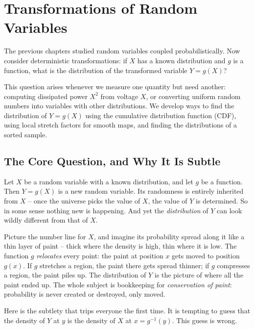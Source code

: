 \chapter{Transformations of Random Variables}

The previous chapters studied random variables coupled probabilistically.
Now consider deterministic transformations: if $X$ has a known distribution and
$g$ is a function, what is the distribution of the transformed variable $Y = g(X)$?

This question arises whenever we measure one quantity but need another:
computing dissipated power $X^2$ from voltage $X$, or converting uniform random
numbers into variables with other distributions. We develop ways to find the distribution of $Y=g(X)$ using the cumulative distribution function (CDF), using local stretch factors for smooth maps, and finding the distributions of a sorted sample.

\chapterline

\section{The Core Question, and Why It Is Subtle}
\label{ch16:core}

Let $X$ be a random variable with a known distribution, and let $g$ be a function. Then
$Y = g(X)$ is a new random variable. Its randomness is entirely inherited from $X$ -- once
the universe picks the value of $X$, the value of $Y$ is determined. So in some sense
nothing new is happening. And yet the \emph{distribution} of $Y$ can look wildly different
from that of $X$.

\begin{intuitionbox}
Picture the number line for $X$, and imagine its probability spread along it like a thin
layer of paint -- thick where the density is high, thin where it is low. The function $g$
\emph{relocates} every point: the paint at position $x$ gets moved to position $g(x)$.
If $g$ stretches a region, the paint there gets spread thinner; if $g$ compresses a
region, the paint piles up. The distribution of $Y$ is the picture of where all the
paint ended up. The whole subject is bookkeeping for \emph{conservation of paint}:
probability is never created or destroyed, only moved.
\end{intuitionbox}

Here is the subtlety that trips everyone the first time. It is tempting to guess that the
density of $Y$ at $y$ is the density of $X$ at $x = g^{-1}(y)$. This guess is wrong.

